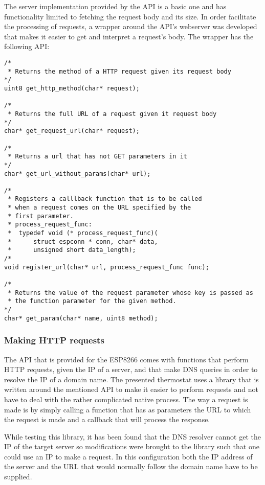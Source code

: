 \qquad The server implementation provided by the API is a basic one and has functionality limited to fetching the
request body and its size. In order facilitate the processing of requests, a wrapper around the API's webserver
was developed that makes it easier to get and interpret a request's body.
The wrapper has the following API:
\clearpage
\begin{lstlisting}[frame=single]
/*
 * Returns the method of a HTTP request given its request body
*/
uint8 get_http_method(char* request);

/*
 * Returns the full URL of a request given it request body
*/
char* get_request_url(char* request);

/*
 * Returns a url that has not GET parameters in it
*/
char* get_url_without_params(char* url);

/*
 * Registers a calllback function that is to be called
 * when a request comes on the URL specified by the
 * first parameter.
 * process_request_func:
 *  typedef void (* process_request_func)(
 *      struct espconn * conn, char* data,
 *      unsigned short data_length);
/*
void register_url(char* url, process_request_func func);

/*
 * Returns the value of the request parameter whose key is passed as
 * the function parameter for the given method.
*/
char* get_param(char* name, uint8 method);
\end{lstlisting}

\subsubsection{Making HTTP requests}

\qquad The API that is provided for the ESP8266 comes with functions that perform HTTP requests, given the IP of a
server, and that make DNS queries in order to resolve the IP of a domain name.
The presented thermostat uses a library \cite{website:httpclient_lib} that is written around the mentioned
API to make it easier to perform requests and not have to deal with the rather complicated native process.
The way a request is made is by simply calling a function that has as parameters the URL to which the request
is made and a callback that will process the response.

While testing this library, it has been found that the DNS resolver cannot get the IP of the target server
so modifications were brought to the library such that one could use an IP to make a request.
In this configuration both the IP address of the server and the URL that would normally follow the domain name
have to be supplied.

